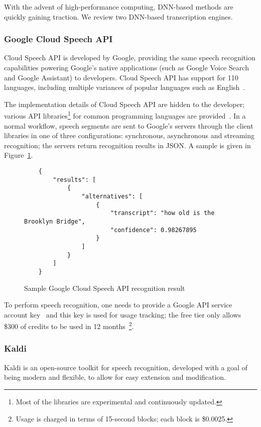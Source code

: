 With the advent of high-performance computing, DNN-based methods are
quickly gaining traction. We review two DNN-based transcription engines.

\subsubsection{Google Cloud Speech API}

Cloud Speech API is developed by Google, providing the same speech
recognition capabilities powering Google's native applications (such as
Google Voice Search and Google Assistant) to developers. Cloud Speech API
has support for 110 languages, including multiple variances of popular
languages such as English~\cite{gcs}.

The implementation details of Cloud Speech API are hidden to the developer;
various API libraries\footnote{Most of the libraries are experimental and
continuously updated.} for common programming languages are
provided~\cite{gcs-libs}. In a normal workflow, speech segments are sent to
Google's servers through the client libraries in one of three configurations:
synchronous, asynchronous and streaming recognition; the servers return
recognition results in JSON\@. A sample is given in Figure~\ref{gcs}.

\begin{figure}[ht]
\begin{lstlisting}
    {
        "results": [
            {
                "alternatives": [
                    {
                        "transcript": "how old is the Brooklyn Bridge",
                        "confidence": 0.98267895
                    }
                ]
            }
        ]
    }      
\end{lstlisting}
\caption{Sample Google Cloud Speech API recognition result}\label{gcs}
\end{figure}

To perform speech recognition, one needs to provide
a Google API service account key~\cite{gcs-api-key} and this key is used
for usage tracking; the free tier only allows \$300 of credits to be used
in 12 months~\cite{gcs-free}\footnote{Usage is charged in terms of 15-second
blocks; each block is \$0.0025.}.

\subsubsection{Kaldi}

Kaldi is an open-source toolkit for speech recognition, developed with a
goal of being modern and flexible, to allow for easy extension and
modification.

